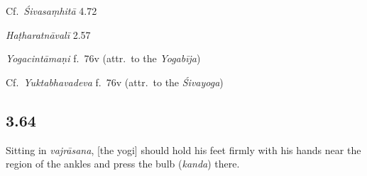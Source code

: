 \begin{ekdosis}
\begin{sources}[hp03_063]
Cf.~\emph{Śivasaṃhitā} 4.72
\begin{versinnote}
\end{versinnote}
\end{sources}

\begin{testimonia}[hp03_063]
\emph{Haṭharatnāvalī} 2.57
\begin{versinnote}
\end{versinnote}

\emph{Yogacintāmaṇi} f.~76v (attr.~to the \emph{Yogabīja})
\begin{versinnote}
\end{versinnote}


Cf.~\emph{Yuktabhavadeva} f.~76v (attr.~to the \emph{Śivayoga})
\begin{versinnote}
\end{versinnote}

\end{testimonia}



\subsection*{3.64}
\begin{translation}[hp03_064]
Sitting in \emph{vajrāsana}, [the yogi] should hold his feet firmly with his hands near the region of the ankles and press the bulb (\emph{kanda}) there.
\end{translation}


\end{ekdosis}
